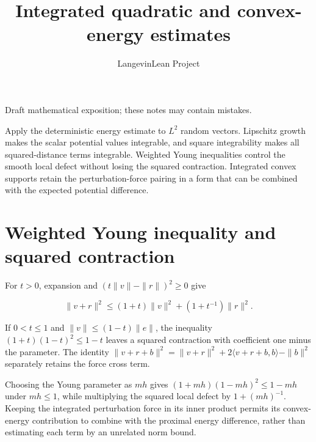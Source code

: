 \documentclass[11pt,a4paper]{article}
\title{\texorpdfstring{Integrated quadratic and convex-energy estimates}{Integrated quadratic and convex-energy estimates}}
\author{LangevinLean Project}
\date{}
\begin{document}
\maketitle
Draft mathematical exposition; these notes may contain mistakes.


Apply the deterministic energy estimate to \(L^2\) random vectors. Lipschitz growth makes the scalar potential values integrable, and square integrability makes all squared-distance terms integrable. Weighted Young inequalities control the smooth local defect without losing the squared contraction. Integrated convex supports retain the perturbation-force pairing in a form that can be combined with the expected potential difference.


\section{\texorpdfstring{Weighted Young inequality and squared contraction}{Weighted Young inequality and squared contraction}}


For \(t>0\), expansion and \((t\|v\|-\|r\|)^2\ge0\) give

\[\|v+r\|^2\le(1+t)\|v\|^2+(1+t^{-1})\|r\|^2.\]

If \(0<t\le1\) and \(\|v\|\le(1-t)\|e\|\), the inequality \((1+t)(1-t)^2\le1-t\) leaves a squared contraction with coefficient one minus the parameter. The identity \(\|v+r+b\|^2=\|v+r\|^2+2\langle v+r+b,b\rangle-\|b\|^2\) separately retains the force cross term.



Choosing the Young parameter as \(mh\) gives \((1+mh)(1-mh)^2\le1-mh\) under \(mh\le1\), while multiplying the squared local defect by \(1+(mh)^{-1}\). Keeping the integrated perturbation force in its inner product permits its convex-energy contribution to combine with the proximal energy difference, rather than estimating each term by an unrelated norm bound.
\end{document}

